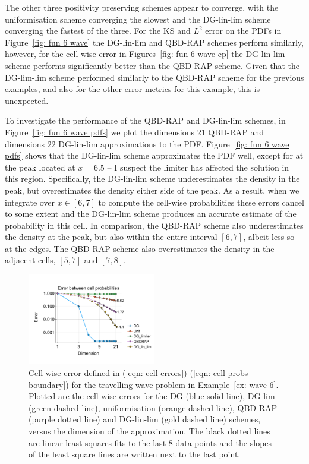 \begin{example}
	The other three positivity preserving schemes appear to converge, with the uniformisation scheme converging the slowest and the DG-lin-lim scheme converging the fastest of the three. For the KS and \(L^2\) error on the PDFs in Figure~\ref{fig: fun 6 wave} the DG-lin-lim and QBD-RAP schemes perform similarly, however, for the cell-wise error in Figures~\ref{fig: fun 6 wave cp} the DG-lin-lim scheme performs significantly better than the QBD-RAP scheme. Given that the DG-lim-lim scheme performed similarly to the QBD-RAP scheme for the previous examples, and also for the other error metrics for this example, this is unexpected. 
	
	To investigate the performance of the QBD-RAP and DG-lin-lim schemes, in Figure~\ref{fig: fun 6 wave pdfs} we plot the dimensions 21 QBD-RAP and dimensions 22 DG-lin-lim approximations to the PDF. Figure~\ref{fig: fun 6 wave pdfs} shows that the DG-lin-lim scheme approximates the PDF well, except for at the peak located at \(x=6.5\) -- I suspect the limiter has affected the solution in this region. Specifically, the DG-lin-lim scheme underestimates the density in the peak, but overestimates the density either side of the peak. As a result, when we integrate over \(x\in[6,7]\) to compute the cell-wise probabilities these errors cancel to some extent and the DG-lin-lim scheme produces an accurate estimate of the probability in this cell. In comparison, the QBD-RAP scheme also underestimates the density at the peak, but also within the entire interval \([6,7]\), albeit less so at the edges. The QBD-RAP scheme also overestimates the density in the adjacent cells, \([5,7]\) and \([7,8]\). 
	\begin{figure}[h]
		\centering
		\includegraphics[width=0.5\textwidth,trim={0.75cm 0.8cm 0.25cm 1.25cm},clip]{chapter6/figs/wave/fun6/L1_cell_probs.pdf}
		\caption{Cell-wise error defined in (\ref{eqn: cell errors})-(\ref{eqn: cell probs boundary}) for the travelling wave problem in Example~\ref{ex: wave 6}. Plotted are the cell-wise errors for the DG (blue solid line), DG-lim (green dashed line), uniformisation (orange dashed line), QBD-RAP (purple dotted line) and DG-lin-lim (gold dashed line) schemes, versus the dimension of the approximation. The black dotted lines are linear least-squares fits to the last 8 data points and the slopes of the least square lines are written next to the last point.}  

\end{figure}
\end{example}
